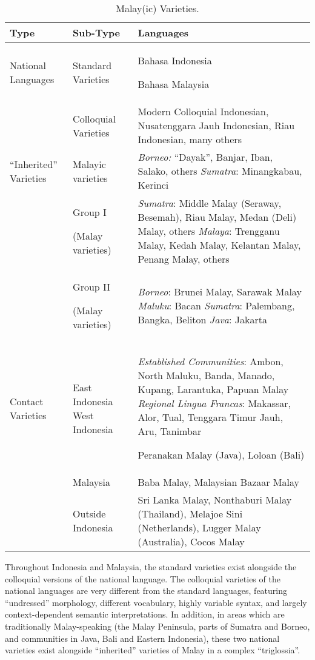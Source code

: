 \begin{table}
\begin{tabular}{llp{5cm}}
\hline
\textbf{Type} &
\textbf{Sub-Type} &
\textbf{Languages}\\\hline
National Languages &
Standard Varieties &
Bahasa Indonesia

Bahasa Malaysia\\\hhline{~--}
 &
Colloquial Varieties &
Modern Colloquial Indonesian, Nusatenggara Jauh Indonesian, Riau Indonesian, many others\\\hline
``Inherited'' Varieties &
Malayic varieties &
\textit{Borneo: }``Dayak'', Banjar, Iban, Salako, others
\newline
\textit{Sumatra}: Minangkabau, Kerinci\\\hhline{~--}
 &
Group I 

(Malay varieties) &
\textit{Sumatra}: Middle Malay (Seraway, Besemah), Riau Malay, Medan (Deli) Malay, others
\newline
\textit{Malaya}: Trengganu Malay, Kedah Malay, Kelantan Malay, Penang Malay, others\\\hhline{~--}
 &
Group II 

(Malay varieties) &
\textit{Borneo}: Brunei Malay, Sarawak Malay
\newline
\textit{Maluku}: Bacan
\newline
\textit{Sumatra}: Palembang, Bangka, Beliton
\newline
\textit{Java}: Jakarta\\\hline
Contact Varieties &
East Indonesia
\newline
West Indonesia &
\textit{Established Communities}: Ambon, North Maluku, Banda, Manado, Kupang, Larantuka,  Papuan Malay
\newline
\textit{Regional Lingua Francas}: Makassar, Alor, Tual, Tenggara Timur Jauh, Aru, Tanimbar

Peranakan Malay (Java), Loloan (Bali)\\\hhline{~--}
 &
Malaysia &
Baba Malay, Malaysian Bazaar Malay\\\hhline{~--}
 &
Outside Indonesia &
Sri Lanka Malay, Nonthaburi Malay (Thailand), Melajoe Sini (Netherlands), Lugger Malay (Australia), Cocos Malay\\\hline
\end{tabular}
\caption{Malay(ic) Varieties.}
\label{paauw:tab:malayicvarieties}
\end{table}

Throughout Indonesia and Malaysia, the standard varieties exist alongside the colloquial versions of the national language. The colloquial varieties of the national languages are very different from the standard languages, featuring ``undressed'' morphology, different vocabulary, highly variable syntax, and largely context-dependent semantic interpretations. In addition, in areas which are traditionally Malay-speaking (the Malay Peninsula, parts of Sumatra and Borneo, and communities in Java, Bali and Eastern Indonesia), these two national varieties exist alongside ``inherited'' varieties of Malay in a complex ``triglossia''.

